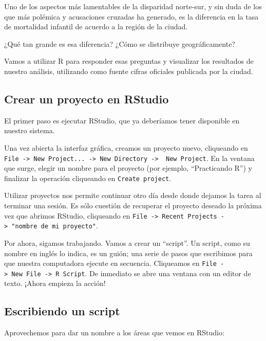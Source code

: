 \documentclass[spanish,]{book}
\begin{document}
Uno de los aspectos más lamentables de la disparidad norte-sur, y sin duda de los que más polémica y acusaciones cruzadas ha generado, es la diferencia en la tasa de mortalidad infantil de acuerdo a la región de la ciudad.

¿Qué tan grande es esa diferencia? ¿Cómo se distribuye geográficamente?

Vamos a utilizar R para responder esas preguntas y visualizar los resultados de nuestro análisis, utilizando como fuente cifras oficiales publicada por la ciudad.

\hypertarget{crear-un-proyecto-en-rstudio}{%
\subsection{Crear un proyecto en RStudio}\label{crear-un-proyecto-en-rstudio}}

El primer paso es ejecutar RStudio, que ya deberíamos tener disponible en nuestro sistema.

Una vez abierta la interfaz gráfica, creamos un proyecto nuevo, cliqueando en \texttt{File\ -\textgreater{}\ New\ Project...\ -\textgreater{}\ New\ Directory\ -\textgreater{}\ \ New\ Project}. En la ventana que surge, elegir un nombre para el proyecto (por ejemplo, ``Practicando R'') y finalizar la operación cliqueando en \texttt{Create\ project}.

Utilizar proyectos nos permite continuar otro día desde donde dejamos la tarea al terminar una sesión. Es sólo cuestión de recuperar el proyecto deseado la próxima vez que abrimos RStudio, cliqueando en \texttt{File\ -\textgreater{}\ Recent\ Projects\ -\textgreater{}\ "nombre\ de\ mi\ proyecto"}.

Por ahora, sigamos trabajando. Vamos a crear un ``script''. Un script, como su nombre en inglés lo indica, es un guión; una serie de pasos que escribimos para que nuestra computadora ejecute en secuencia. Cliqueamos en \texttt{File\ -\textgreater{}\ New\ File\ -\textgreater{}\ R\ Script}. De inmediato se abre una ventana con un editor de texto. ¡Ahora empieza la acción!

\hypertarget{escribiendo-un-script}{%
\subsection{Escribiendo un script}\label{escribiendo-un-script}}

Aprovechemos para dar un nombre a los áreas que vemos en RStudio:
\end{document}
